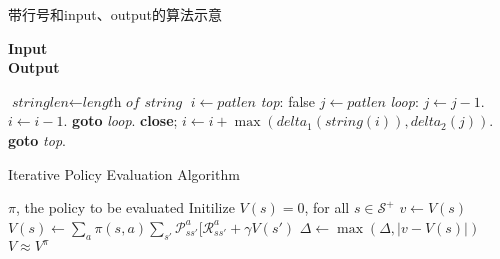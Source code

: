 \documentclass[math,code,logic,quote,code,mode=simple]{codedumpnote}
\begin{document}
\begin{algorithm}
\caption{带行号和input、output的算法示意}\label{alg:cap}
\hspace*{\algorithmicindent} \textbf{Input} \\
\hspace*{\algorithmicindent} \textbf{Output} 
\begin{algorithmic}[1]
    \State $\textit{stringlen} \gets \textit{length of } \textit{string}$
    \State $i \gets \textit{patlen}$
    \State \emph{top}:
     \Return false
    \EndIf
    \State $j \gets \textit{patlen}$
    \State \emph{loop}:
    \State $j \gets j-1$.
    \State $i \gets i-1$.
    \State \textbf{goto} \emph{loop}.
    \State \textbf{close};
    \EndIf
    \State $i \gets i+\max(\textit{delta}_1(\textit{string}(i)),\textit{delta}_2(j))$.
    \State \textbf{goto} \emph{top}.
    \EndProcedure\end{algorithmic}
\end{algorithm}

\begin{algorithm} 
\caption{Iterative Policy Evaluation Algorithm}
\begin{algorithmic}[1]
\Require $\pi$, the policy to be evaluated
\State Initilize $V(s) = 0$, for all $s \in \mathcal S^+$
\Repeat
{}
\State $v \gets V(s)$
\State $V(s) \gets \sum_a \pi(s,a) \sum_{s'} \mathcal P_{ss'}^a [ \mathcal R_{ss'}^a + \gamma V(s')$
\State $\Delta \gets \max(\Delta, |v- V(s)|)$
\EndFor
{}
\Ensure $V \approx V^\pi$
\end{algorithmic}
\end{algorithm}
\end{document}

